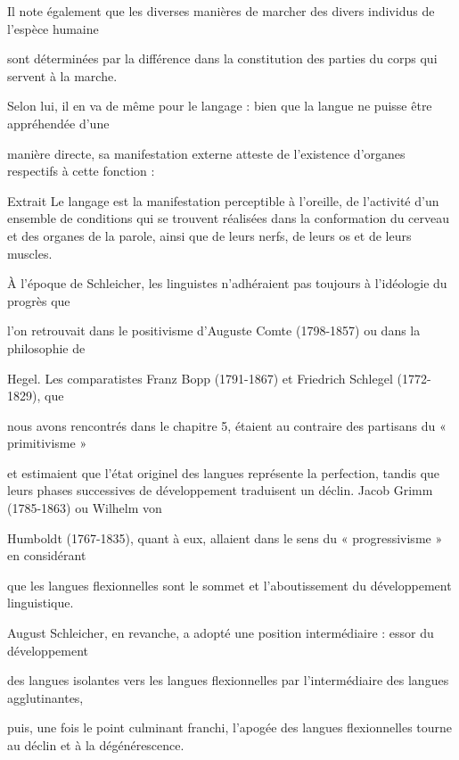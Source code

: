 Il note également que les diverses manières de marcher des divers individus de l’espèce humaine

sont déterminées par la différence dans la constitution des parties du corps qui servent à la marche.

Selon lui, il en va de même pour le langage : bien que la langue ne puisse être appréhendée d’une

manière directe, sa manifestation externe atteste de l'existence d'organes respectifs à cette fonction :

\begin{lecture}{Extrait}
Le langage est la manifestation perceptible à l'oreille, de l'activité d'un ensemble de conditions qui se trouvent réalisées dans la conformation du cerveau et des organes de la parole, ainsi que de leurs nerfs, de leurs os et de leurs muscles.
\end{lecture}


À l'époque de Schleicher, les linguistes n’adhéraient pas toujours à l'idéologie du progrès que

l'on retrouvait dans le positivisme d'Auguste Comte (1798-1857) ou dans la philosophie de

Hegel. Les comparatistes Franz Bopp (1791-1867) et Friedrich Schlegel (1772-1829), que

nous avons rencontrés dans le chapitre 5, étaient au contraire des partisans du « primitivisme »

et estimaient que l'état originel des langues représente la perfection, tandis que leurs phases
successives de développement traduisent un déclin. Jacob Grimm (1785-1863) ou Wilhelm von

Humboldt (1767-1835), quant à eux, allaient dans le sens du « progressivisme » en considérant

que les langues flexionnelles sont le sommet et l'aboutissement du développement linguistique.

August Schleicher, en revanche, a adopté une position intermédiaire : essor du développement

des langues isolantes vers les langues flexionnelles par l'intermédiaire des langues agglutinantes,

puis, une fois le point culminant franchi, l'apogée des langues flexionnelles tourne au déclin et à la
dégénérescence.
